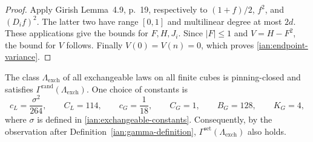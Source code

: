 \begin{proof}
Apply Girish Lemma~4.9, p.~19, respectively to
\((1+f)/2\), \(f^2\), and \((D_i f)^2\).
The latter two have range \([0,1]\) and multilinear degree at most
\(2d\). These applications give the bounds for \(F,H,J_i\).
Since \(|F|\le1\) and \(V=H-F^2\), the bound for \(V\) follows.
Finally \(V(0)=V(n)=0\), which proves
\eqref{ian:endpoint-variance}.
\end{proof}

\begin{theorem}[Theorem B]
\label{ian:exchangeable-gamma}
The class \(\Lambda_{\mathrm{exch}}\) of all
exchangeable laws on all finite cubes is pinning-closed and satisfies
\(\Gamma^{\mathrm{rand}}(\Lambda_{\mathrm{exch}})\). One choice of
constants is
\[
 c_L=\frac{\sigma^2}{264},\qquad C_L=114,\qquad
 c_G=\frac1{18},\qquad C_G=1,\qquad
 B_G=128,\qquad K_G=4,
 \tag{12}\label{ian:exchangeable-gamma-constants}
\]
where \(\sigma\) is defined in
\eqref{ian:exchangeable-constants}. Consequently, by the observation after
Definition~\ref{ian:gamma-definition},
\(\Gamma^{\mathrm{set}}(\Lambda_{\mathrm{exch}})\) also holds.
\end{theorem}

